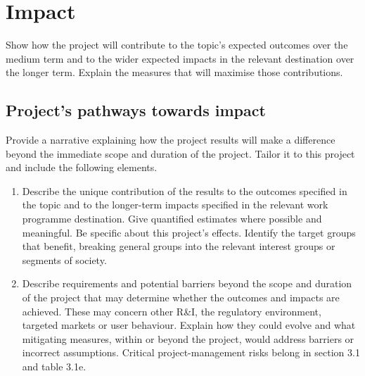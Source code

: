 \section{Impact}\label{sec:impact}


\begin{heguidance}
Show how the project will contribute to the topic's expected outcomes over the
medium term and to the wider expected impacts in the relevant destination over
the longer term. Explain the measures that will maximise those contributions.
\end{heguidance}

\subsection{Project's pathways towards impact}
\label{sec:pathways}
\begin{heguidance}
Provide a narrative explaining how the project results will make a difference
beyond the immediate scope and duration of the project. Tailor it to this
project and include the following elements.
\begin{enumerate}[label=(\alph*)]
  \item Describe the unique contribution of the results to the outcomes
  specified in the topic and to the longer-term impacts specified in the
  relevant work programme destination. Give quantified estimates where
  possible and meaningful. Be specific about this project's effects. Identify
  the target groups that benefit, breaking general groups into the relevant
  interest groups or segments of society.
  \item Describe requirements and potential barriers beyond the scope and
  duration of the project that may determine whether the outcomes and impacts
  are achieved. These may concern other R\&I, the regulatory environment,
  targeted markets or user behaviour. Explain how they could evolve and what
  mitigating measures, within or beyond the project, would address barriers or
  incorrect assumptions. Critical project-management risks belong in section
  3.1 and table 3.1e.
\end{enumerate}
\end{heguidance}

